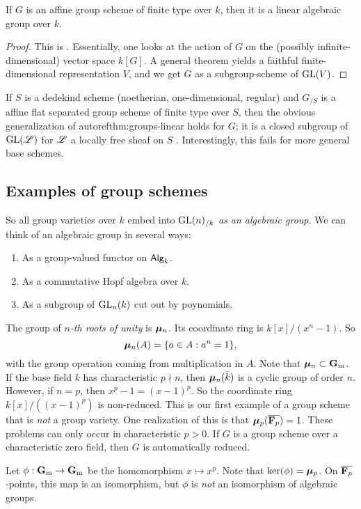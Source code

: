 \begin{theorem}\label{thm:groups-linear}
If $G$ is an affine group scheme of finite type over $k$, then it is a 
linear algebraic group over $k$. 
\end{theorem}
\begin{proof}
This is \cite[6b.11.11]{sga3-i}. Essentially, one looks at the action of $G$ 
on the (possibly infinite-dimensional) vector space $k[G]$. A general theorem 
yields a faithful finite-dimensional representation $V$, and we get $G$ as a 
subgroup-scheme of $\operatorname{GL}(V)$. 
\end{proof}

\begin{hard}
If $S$ is a dedekind scheme (noetherian, one-dimensional, regular) and $G_{/S}$ 
is a affine flat separated group scheme of finite type over $S$, then the 
obvious generalization of autoref{thm:groups-linear} holds for $G$; it is a 
closed subgroup of $\operatorname{GL}(\mathscr{L})$ for $\mathscr{L}$ a locally free sheaf on $S$ 
\cite[6b.11.11.1]{sga3-i}. 
Interestingly, this fails for more general base schemes. 
\end{hard}





\subsection{Examples of group schemes}

So all group varieties over $k$ embed into $\operatorname{GL}(n)_{/k}$ \emph{as an algebraic 
group}. We can think of an algebraic group in several ways: 
\begin{enumerate}
  \item As a group-valued functor on $\mathsf{Alg}_{k}$. 
  \item As a commutative Hopf algebra over $k$. 
  \item As a subgroup of $\operatorname{GL}_n(k)$ cut out by poynomials. 
\end{enumerate}

\begin{example}
The group of \emph{$n$-th roots of unity} is $\bm{\mu}_n$. Its coordinate ring is 
$k[x]/(x^n-1)$. So 
\[
  \bm{\mu}_n(A) = \{a\in A:a^n=1\} ,
\]
with the group operation coming from multiplication in $A$. Note that 
$\bm{\mu}_n\subset \mathbf{G}_\mathrm{m}$. If the base field $k$ has characteristic 
$p\nmid n$, then $\bm{\mu}_n(\bar k)$ is a cyclic group of order $n$. However, if 
$n=p$, then $x^p-1=(x-1)^p$. So the coordinate ring 
$k[x]/((x-1)^p)$ is non-reduced. This is our first example of a group scheme 
that is \emph{not} a group variety. One realization of this is that 
$\bm{\mu}_p(\overline{\mathbf{F}_p})=1$. These problems can only occur in characteristic 
$p>0$. If $G$ is a group scheme over a characteristic zero field, then 
$G$ is automatically reduced. 

Let $\phi:\mathbf{G}_\mathrm{m}\to \mathbf{G}_\mathrm{m}$ be the homomorphism $x\mapsto x^p$. Note that 
$\ker(\phi)=\bm{\mu}_p$. On $\overline{\mathbf{F}_p}$-points, this map is an isomorphism, 
but $\phi$ is \emph{not} an isomorphism of algebraic groups. 
\end{example}

